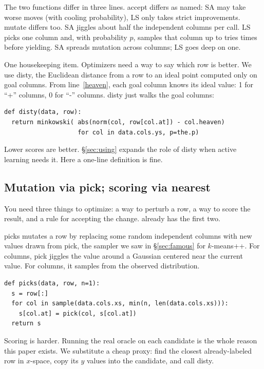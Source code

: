 The two functions differ in three lines. \textsf{accept} differs as
named: SA may take worse moves (with cooling probability), LS only
takes strict improvements. \textsf{mutate} differs too. SA jiggles
about half the independent columns per call. LS picks one column
and, with probability $p$, samples that column up to \textsf{tries}
times before yielding. SA spreads mutation across columns; LS goes
deep on one.

One housekeeping item. Optimizers need a way to say which row is
better. We use \textsf{disty}, the Euclidean distance from a row to
an ideal point computed only on goal columns. From line~\ref{heaven},
each goal column knows its ideal value: 1 for ``+'' columns, 0 for
``-'' columns. \textsf{disty} just walks the goal columns:

\begin{verbatim}
def disty(data, row): 
  return minkowski( abs(norm(col, row[col.at]) - col.heaven)
                    for col in data.cols.ys, p=the.p)
\end{verbatim}

Lower scores are better. \S\ref{sec:using} expands the role of
\textsf{disty} when active learning needs it. Here a one-line
definition is fine.

\subsection{Mutation via \textsf{pick}; scoring via \textsf{nearest}}\label{spick}

You need three things to optimize: a way to perturb a row, a way to
score the result, and a rule for accepting the change. \IT{} already
has the first two.

\textsf{picks} mutates a row by replacing some random independent
columns with new values drawn from \textsf{pick}, the sampler we saw
in \S\ref{sec:famous} for $k$-means++. For  columns,
\textsf{pick} jiggles the value around a Gaussian centered near the
current value. For  columns, it samples from the observed
distribution.

\begin{verbatim}
def picks(data, row, n=1): 
  s = row[:]
  for col in sample(data.cols.xs, min(n, len(data.cols.xs))):
    s[col.at] = pick(col, s[col.at])
  return s
\end{verbatim}

Scoring is harder. Running the real oracle on each candidate is the
whole reason this paper exists. We substitute a cheap proxy: find the
closest already-labeled row in $x$-space, copy its $y$ values into
the candidate, and call \textsf{disty}.


